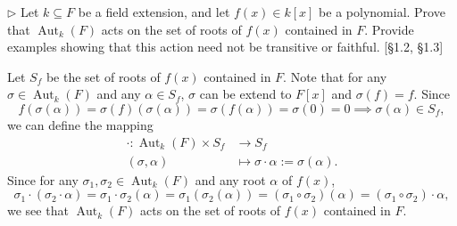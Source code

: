 \begin{problem}[1.6]
$\triangleright$ Let $k \subseteq F$ be a field extension, and let $f(x) \in k[x]$ be a polynomial. Prove that $\operatorname{Aut}_{k}(F)$ acts on the set of roots of $f(x)$ contained in $F$. Provide examples showing that this action need not be transitive or faithful. [\S1.2, \S1.3]
\end{problem}
\begin{solution}
Let $S_f$ be the set of roots of $f(x)$ contained in $F$. Note that for any $\sigma\in\operatorname{Aut}_{k}(F)$ and any $\alpha\in S_f$, $\sigma$ can be extend to $F[x]$ and $\sigma(f)=f$. Since
\[
f(\sigma(\alpha))=\sigma(f)(\sigma(\alpha))=\sigma(f(\alpha))=\sigma(0)=0\implies\sigma(\alpha)\in S_f,
\]
we can define the mapping
\begin{align*}
	\cdot:\operatorname{Aut}_{k}(F)\times S_f &\longrightarrow S_f\\
	(\sigma, \alpha) &\longmapsto  \sigma\cdot\alpha:=\sigma(\alpha).
\end{align*}
Since for any $\sigma_1,\sigma_2\in\operatorname{Aut}_{k}(F)$ and any root $\alpha$ of $f(x)$,
\[
\sigma_1\cdot(\sigma_2\cdot\alpha)=\sigma_1\cdot\sigma_2(\alpha)=\sigma_1(\sigma_2(\alpha))=(\sigma_1\circ\sigma_2)(\alpha)=(\sigma_1\circ\sigma_2)\cdot\alpha,
\]
we see that $\operatorname{Aut}_{k}(F)$ acts on the set of roots of $f(x)$ contained in $F$.
\end{solution}



